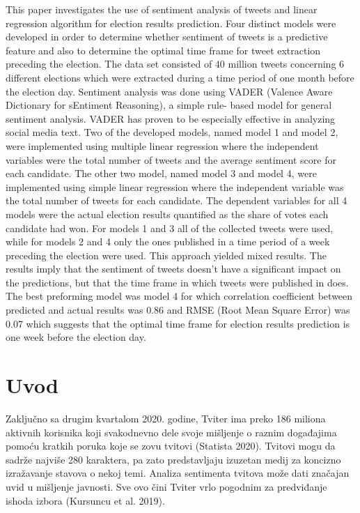 \begin{AbstractEng}
This paper investigates the use of sentiment analysis of tweets and linear regression algorithm for
election results prediction. Four distinct models were developed in order to determine whether
sentiment of tweets is a predictive feature and also to determine the optimal time frame for tweet
extraction preceding the election. The data set consisted of 40 million tweets concerning 6 different
elections which were extracted during a time period of one month before the election day. Sentiment
analysis was done using VADER (Valence Aware Dictionary for sEntiment Reasoning), a simple rule-
based model for general sentiment analysis. VADER has proven to be especially effective in analyzing
social media text. Two of the developed models, named model 1 and model 2, were implemented using
multiple linear regression where the independent variables were the total number of tweets and the
average sentiment score for each candidate. The other two model, named model 3 and model 4, were
implemented using simple linear regression where the independent variable was the total number of
tweets for each candidate. The dependent variables for all 4 models were the actual election results
quantified as the share of votes each candidate had won. For models 1 and 3 all of the collected tweets
were used, while for models 2 and 4 only the ones published in a time period of a week preceding the
election were used. This approach yielded mixed results. The results imply that the sentiment of tweets
doesn’t have a significant impact on the predictions, but that the time frame in which tweets were
published in does. The best preforming model was model 4 for which correlation coefficient between
predicted and actual results was 0.86 and RMSE (Root Mean Square Error) was 0.07 which suggests
that the optimal time frame for election results prediction is one week before the election day.
\end{AbstractEng}

\StartDoublePaper
\label{rac.petra}

\section{Uvod}

Zaključno sa drugim kvartalom 2020. godine, Tviter ima preko 186 miliona aktivnih korisnika koji
svakodnevno dele svoje mišljenje o raznim događajima pomoću kratkih poruka koje se zovu tvitovi
(Statista 2020). Tvitovi mogu da sadrže najviše 280 karaktera, pa zato predstavljaju izuzetan medij za
koncizno izražavanje stavova o nekoj temi. Analiza sentimenta tvitova može dati značajan uvid u
mišljenje javnosti. Sve ovo čini Tviter vrlo pogodnim za predviđanje ishoda izbora (Kursuncu et al.
2019).

